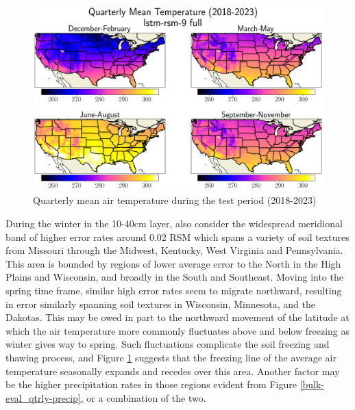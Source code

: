 \begin{figure}[h!]
    \centering

    \includegraphics[width=.99\linewidth,draft=false]{figures/grid-eval_qtrly/eval-grid_full_lstm-rsm-9_pixelwise-time-stats_abs-err_qtrly-horizon-tmp.png}

    \caption{Quarterly mean air temperature during the test period (2018-2023)}
    \label{bulk-eval_qtrly_temp}
\end{figure}

During the winter in the 10-40cm layer, also consider the widespread meridional band of higher error rates around 0.02 RSM which spans a variety of soil textures from Missouri through the Midwest, Kentucky, West Virginia and Pennsylvania. This area is bounded by regions of lower average error to the North in the High Plains and Wisconsin, and broadly in the South and Southeast. Moving into the spring time frame, similar high error rates seem to migrate northward, resulting in error similarly spanning soil textures in Wisconsin, Minnesota, and the Dakotas. This may be owed in part to the northward movement of the latitude at which the air temperature more commonly fluctuates above and below freezing as winter gives way to spring. Such fluctuations complicate the soil freezing and thawing process, and Figure \ref{bulk-eval_qtrly_temp} suggests that the freezing line of the average air temperature seasonally expands and recedes over this area. Another factor may be the higher precipitation rates in those regions evident from Figure \ref{bulk-eval_qtrly-precip}, or a combination of the two.

